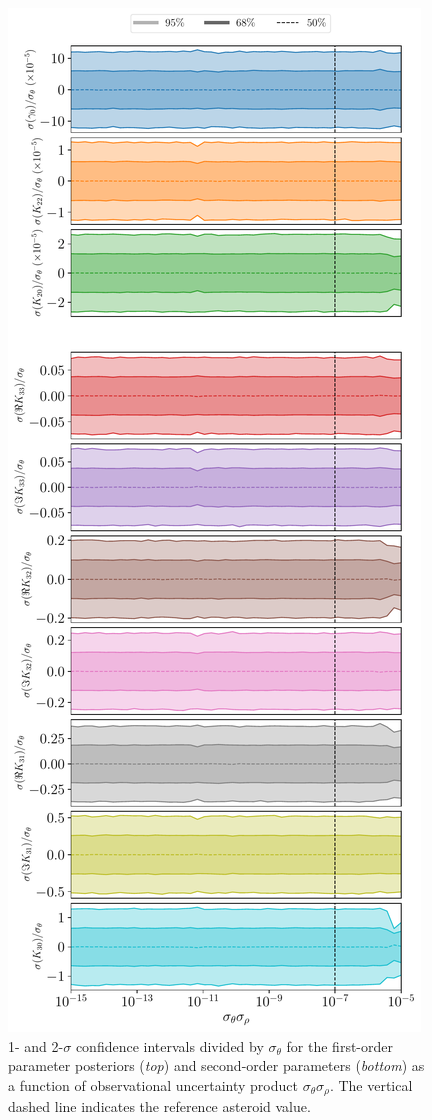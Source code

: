 \documentclass[fleqn,usenatbib]{mnras}
\begin{document}
\begin{figure}
  \centering
  \includegraphics[height=0.89\textheight]{figs/scan-product.pdf}
  \caption{1- and 2-$\sigma$ confidence intervals divided by $\sigma_\theta$ for the first-order parameter posteriors (\textit{top}) and second-order parameters (\textit{bottom}) as a function of observational uncertainty product $\sigma_\theta \sigma_\rho$. The vertical dashed line indicates the reference asteroid value.}
  \label{fig:scan-product}
\end{figure}
\end{document}
